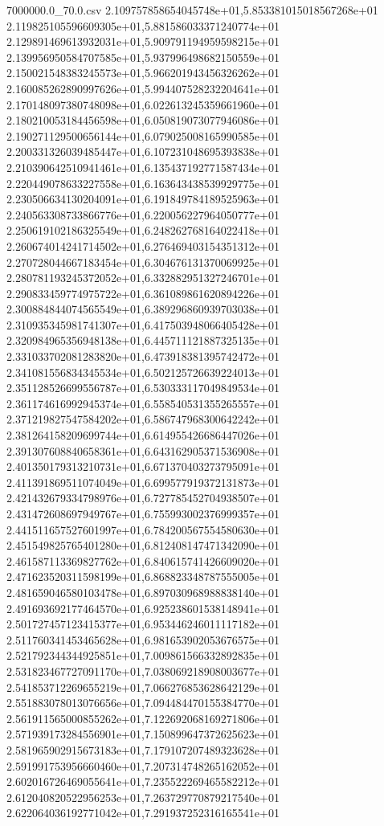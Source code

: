 \begin{filecontents*}{7000000.0_70.0.csv}
2.109757858654045748e+01,5.853381015018567268e+01
2.119825105596609305e+01,5.881586033371240774e+01
2.129891469613932031e+01,5.909791194959598215e+01
2.139956950584707585e+01,5.937996498682150559e+01
2.150021548383245573e+01,5.966201943456326262e+01
2.160085262890997626e+01,5.994407528232204641e+01
2.170148097380748098e+01,6.022613245359661960e+01
2.180210053184456598e+01,6.050819073077946086e+01
2.190271129500656144e+01,6.079025008165990585e+01
2.200331326039485447e+01,6.107231048695393838e+01
2.210390642510941461e+01,6.135437192771587434e+01
2.220449078633227558e+01,6.163643438539929775e+01
2.230506634130204091e+01,6.191849784189525963e+01
2.240563308733866776e+01,6.220056227964050777e+01
2.250619102186325549e+01,6.248262768164022418e+01
2.260674014241714502e+01,6.276469403154351312e+01
2.270728044667183454e+01,6.304676131370069925e+01
2.280781193245372052e+01,6.332882951327246701e+01
2.290833459774975722e+01,6.361089861620894226e+01
2.300884844074565549e+01,6.389296860939703038e+01
2.310935345981741307e+01,6.417503948066405428e+01
2.320984965356948138e+01,6.445711121887325135e+01
2.331033702081283820e+01,6.473918381395742472e+01
2.341081556834345534e+01,6.502125726639224013e+01
2.351128526699556787e+01,6.530333117049849534e+01
2.361174616992945374e+01,6.558540531355265557e+01
2.371219827547584202e+01,6.586747968300642242e+01
2.381264158209699744e+01,6.614955426686447026e+01
2.391307608840658361e+01,6.643162905371536908e+01
2.401350179313210731e+01,6.671370403273795091e+01
2.411391869511074049e+01,6.699577919372131873e+01
2.421432679334798976e+01,6.727785452704938507e+01
2.431472608697949767e+01,6.755993002376999357e+01
2.441511657527601997e+01,6.784200567554580630e+01
2.451549825765401280e+01,6.812408147471342090e+01
2.461587113369827762e+01,6.840615741426609020e+01
2.471623520311598199e+01,6.868823348787555005e+01
2.481659046580103478e+01,6.897030968988838140e+01
2.491693692177464570e+01,6.925238601538148941e+01
2.501727457123415377e+01,6.953446246011117182e+01
2.511760341453465628e+01,6.981653902053676575e+01
2.521792344344925851e+01,7.009861566332892835e+01
2.531823467727091170e+01,7.038069218908003677e+01
2.541853712269655219e+01,7.066276853628642129e+01
2.551883078013076656e+01,7.094484470155384770e+01
2.561911565000855262e+01,7.122692068169271806e+01
2.571939173284556901e+01,7.150899647372625623e+01
2.581965902915673183e+01,7.179107207489323628e+01
2.591991753956660460e+01,7.207314748265162052e+01
2.602016726469055641e+01,7.235522269465582212e+01
2.612040820522956253e+01,7.263729770879217540e+01
2.622064036192771042e+01,7.291937252316165541e+01

\end{filecontents*}

